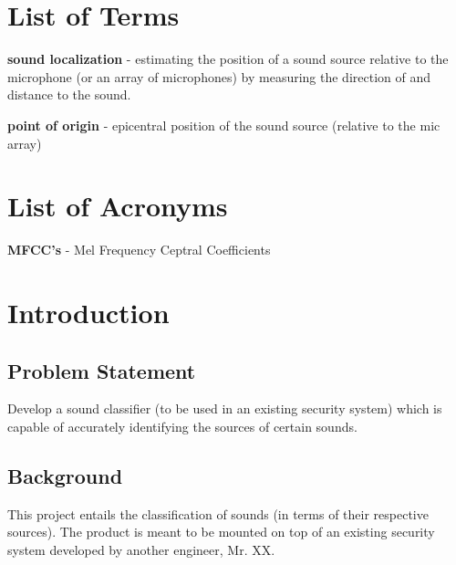 \documentclass[a4paper,12pt]{article}
\numberwithin{equation}{section}
\numberwithin{figure}{section}
\numberwithin{table}{section}
\begin{document}
\section*{List of Terms}
\textbf{sound localization} - estimating the position of a sound source relative to the microphone (or an array of microphones) by measuring the direction of and distance to the sound.

\textbf{point of origin} - epicentral position of the sound source (relative to the mic array)

\section*{List of Acronyms}
\textbf{MFCC's} - Mel Frequency Ceptral Coefficients\\































\newpage
{}







\section{Introduction}

\subsection{Problem Statement}
Develop a sound classifier (to be used in an existing security system) which is capable of accurately identifying the sources of certain sounds.


\subsection{Background}
This project entails the classification of sounds (in terms of their respective sources). The product is meant to be mounted on top of an existing security system developed by another engineer, Mr. XX. %
\end{document}
